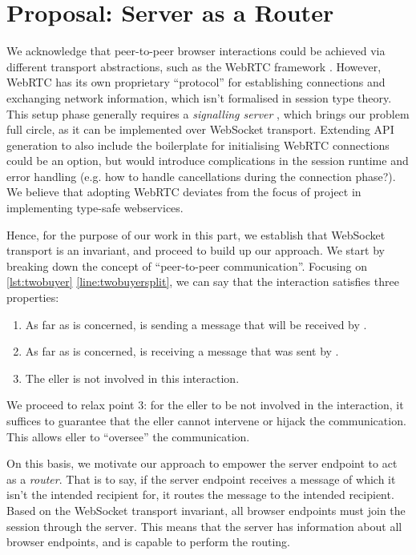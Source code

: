 \section{Proposal: Server as a Router}
\label{section:routerapproach}

We acknowledge that peer-to-peer browser interactions
could be achieved via different transport abstractions, 
such as the WebRTC framework \cite{WebRTC}. 
However, WebRTC has its own proprietary ``protocol'' 
for establishing connections and exchanging network information,
which isn't formalised in session type theory. This setup phase
generally requires a \textit{signalling server} \cite{WebRTCSignaling},
which brings our problem full circle, as it can be implemented
over WebSocket transport. Extending API generation to also include
the boilerplate for initialising WebRTC connections could be an option,
but would introduce complications in the session runtime and
error handling (e.g. how to handle cancellations during the connection
phase?).
We believe that adopting WebRTC deviates from the focus of project in 
implementing type-safe webservices.

Hence, for the purpose of our work in this part,
we establish that WebSocket transport is an invariant, 
and proceed to build up our approach. 
We start by breaking down the concept of 
``peer-to-peer communication''.
Focusing on \cref{lst:twobuyer} \cref{line:twobuyersplit},
we can say that the interaction satisfies three properties:

\begin{enumerate}
\item 
As far as  is concerned,  is sending
a message that will be received by .

\item
As far as  is concerned,  is receiving
a message that was sent by .

\item
The eller is not involved in this interaction.
\end{enumerate}

We proceed to relax point 3: for the eller to be
not involved in the interaction, it suffices to guarantee that
the eller cannot intervene or hijack the communication.
This allows eller to ``oversee'' the communication.

On this basis, we motivate our approach to empower the 
server endpoint to act as a \textit{router}. 
That is to say, if the server endpoint receives a message
of which it isn't the intended recipient for, 
it routes the message to the intended recipient. 
Based on the WebSocket transport invariant,
all browser endpoints must join the session
through the server. This means that the server has information about
all browser endpoints, 
and is capable to perform the routing.

